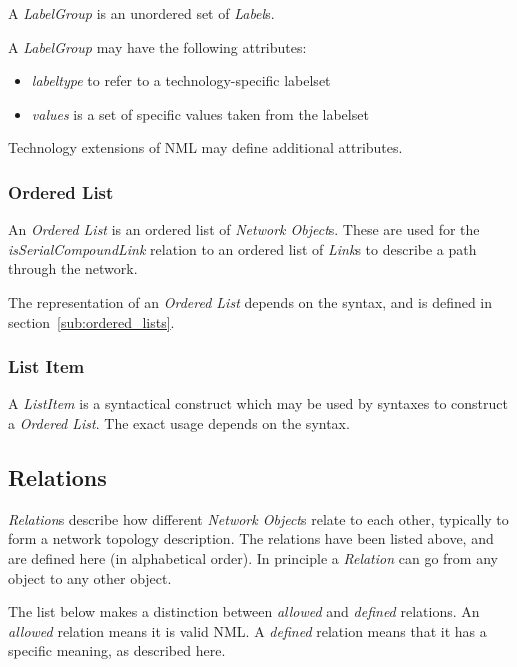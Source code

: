 A \emph{LabelGroup} is an unordered set of \emph{Label}s.

A \emph{LabelGroup} may have the following attributes:
\begin{itemize}
    \item \emph{labeltype} to refer to a technology-specific labelset
    \item \emph{values} is a set of specific values taken from the labelset
\end{itemize}

Technology extensions of NML may define additional attributes.


\subsubsection{Ordered List}%
\label{class:ordered_list}

An \emph{Ordered List} is an ordered list of \emph{Network Object}s. These are used for the \emph{isSerialCompoundLink} relation to an ordered list of \emph{Link}s to describe a path through the network.

The representation of an \emph{Ordered List} depends on the syntax, and is defined in section~\ref{sub:ordered_lists}.


\subsubsection{List Item}%
\label{class:list_item}

A \emph{ListItem} is a syntactical construct which may be used by syntaxes to construct a \emph{Ordered List}. The exact usage depends on the syntax.



\subsection{Relations}
\label{sub:relations}

\emph{Relation}s describe how different \emph{Network Object}s relate to each other, 
typically to form a network topology description. 
The relations have been listed above, and are defined here (in alphabetical order). 
In principle a \emph{Relation} can go from any object to any other object. 

The list below makes a distinction between \emph{allowed} and \emph{defined} relations.
An \emph{allowed} relation means it is valid NML.
A \emph{defined} relation means that it has a specific meaning, as described here.

